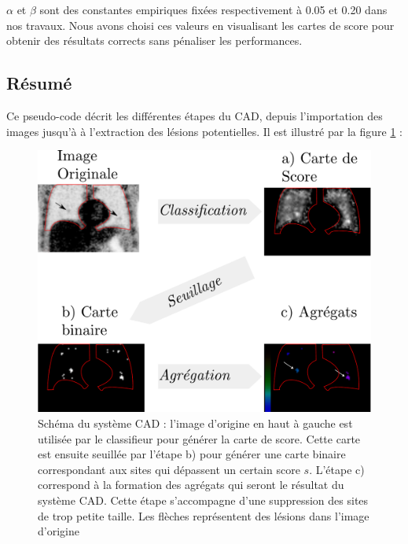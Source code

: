 $\alpha$ et $\beta$ sont des constantes empiriques fixées respectivement à 0.05 et 0.20 dans nos travaux. Nous avons choisi ces valeurs en visualisant les cartes de score pour obtenir des résultats corrects sans pénaliser les performances.

\subsection{Résumé}

Ce pseudo-code décrit les différentes étapes du CAD, depuis l'importation des images jusqu'à à l'extraction des lésions potentielles. Il est illustré par la figure \ref{fig:cheminementCAD} :

\begin{figure}
 \centering
 \includegraphics[width=15cm]{images/cheminementCAD}
 \caption[Schéma du système CAD]{Schéma du système CAD : l'image d'origine en haut à gauche est utilisée par le classifieur pour générer la carte de score. Cette carte est ensuite seuillée par l'étape b) pour générer une carte binaire correspondant aux sites qui dépassent un certain score $s$. L'étape c) correspond à la formation des agrégats qui seront le résultat du système CAD. Cette étape s'accompagne d'une suppression des sites de trop petite taille. Les flèches représentent des lésions dans l'image d'origine}
 \label{fig:cheminementCAD}
\end{figure}

